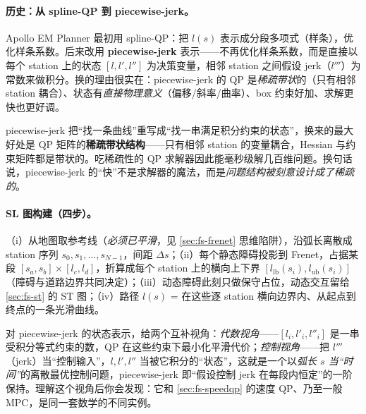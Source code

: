 \paragraph{历史：从 spline-QP 到 piecewise-jerk。}
Apollo EM Planner 最初用 spline-QP\cite{fan2018baidu}：把 $l(s)$ 表示成分段多项式（样条），优化样条系数。后来改用 \textbf{piecewise-jerk} 表示——不再优化样条系数，而是直接以每个 station 上的状态 $[l,l',l'']$ 为决策变量，相邻 station 之间假设 jerk（$l'''$）为常数来做积分。换的理由很实在：piecewise-jerk 的 QP 是\emph{稀疏带状}的（只有相邻 station 耦合）、状态有\emph{直接物理意义}（偏移/斜率/曲率）、box 约束好加、求解更快也更好调。

\begin{insight}
piecewise-jerk 把“找一条曲线”重写成“找一串满足积分约束的状态”，换来的最大好处是 QP 矩阵的\textbf{稀疏带状结构}——只有相邻 station 的变量耦合，Hessian 与约束矩阵都是带状的。吃稀疏性的 QP 求解器因此能毫秒级解几百维问题。换句话说，piecewise-jerk 的“快”不是求解器的魔法，而是\emph{问题结构被刻意设计成了稀疏的}。
\end{insight}

\paragraph{SL 图构建（四步）。}
（i）从地图取参考线（\emph{必须已平滑}，见 \cref{sec:fs-frenet} 思维陷阱），沿弧长离散成 station 序列 $s_0,s_1,\dots,s_{N-1}$，间距 $\Delta s$；（ii）每个静态障碍投影到 Frenet，占据某段 $[s_a,s_b]\times[l_c,l_d]$，折算成每个 station 上的横向上下界 $[l_{\mathrm{lb}}(s_i),l_{\mathrm{ub}}(s_i)]$（障碍与道路边界共同决定）；（iii）动态障碍此刻只做保守占位，动态交互留给 \cref{sec:fs-st} 的 ST 图；（iv）路径 $l(s)$ = 在这些逐 station 横向边界内、从起点到终点的一条光滑曲线。

对 piecewise-jerk 的状态表示，给两个互补视角：\emph{代数视角}——$[l_i,l'_i,l''_i]$ 是一串受积分等式约束的数，QP 在这些约束下最小化平滑代价；\emph{控制视角}——把 $l'''$（jerk）当“控制输入”，$l,l',l''$ 当被它积分的“状态”，这就是一个以\emph{弧长 $s$ 当“时间”}的离散最优控制问题，piecewise-jerk 即“假设控制 jerk 在每段内恒定”的一阶保持。理解这个视角后你会发现：它和 \cref{sec:fs-speedqp} 的速度 QP、乃至一般 MPC，是同一套数学的不同实例。

